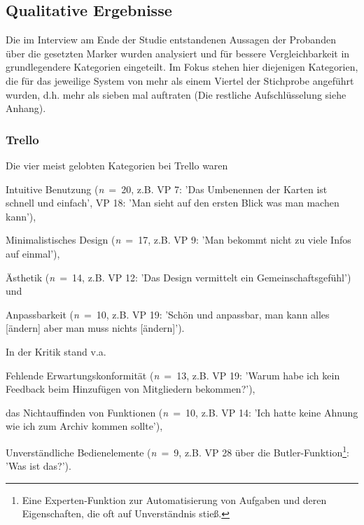 \subsection{Qualitative Ergebnisse}
Die im Interview am Ende der Studie entstandenen Aussagen der Probanden über die gesetzten Marker wurden analysiert und für bessere Vergleichbarkeit in grundlegendere Kategorien eingeteilt. Im Fokus stehen hier diejenigen Kategorien, die für das jeweilige System von mehr als einem Viertel der Stichprobe angeführt wurden, d.h. mehr als sieben mal auftraten (Die restliche Aufschlüsselung siehe Anhang).\\

\subsubsection{Trello}
Die vier meist gelobten Kategorien bei Trello waren
\begin{seriate}
    \item Intuitive Benutzung (\textit{n}~=~20, z.B. VP 7: 'Das Umbenennen der Karten ist schnell und einfach', VP 18: 'Man sieht auf den ersten Blick was man machen kann'),
    \item Minimalistisches Design (\textit{n}~=~17, z.B. VP 9: 'Man bekommt nicht zu viele Infos auf einmal'),
    \item Ästhetik (\textit{n}~=~14, z.B. VP 12: 'Das Design vermittelt ein Gemeinschaftsgefühl') und 
    \item Anpassbarkeit (\textit{n}~=~10, z.B. VP 19: 'Schön und anpassbar, man kann alles [ändern] aber man muss nichts [ändern]').
\end{seriate}{}



In der Kritik stand v.a. 
\begin{seriate}
    \item Fehlende Erwartungskonformität (\textit{n}~=~13, z.B. VP 19: 'Warum habe ich kein Feedback beim Hinzufügen von Mitgliedern bekommen?'), 
    \item das Nichtauffinden von Funktionen (\textit{n}~=~10, z.B. VP 14: 'Ich hatte keine Ahnung wie ich zum Archiv kommen sollte'), 
    \item Unverständliche Bedienelemente (\textit{n}~=~9, z.B. VP 28 über die Butler-Funktion\footnote{Eine Experten-Funktion zur Automatisierung von Aufgaben und deren Eigenschaften, die oft auf Unverständnis stieß.}: 'Was ist das?').
\end{seriate}




